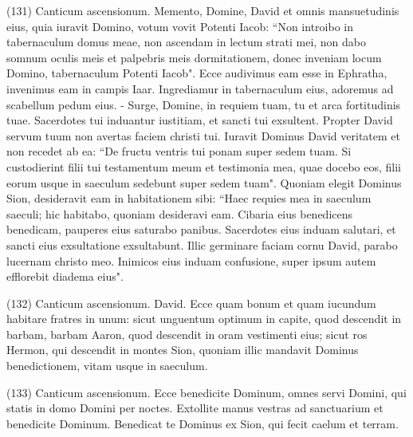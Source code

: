 \begin{biblechapter}  (131) 
\verse  Canticum ascensionum. Memento, Domine, David et omnis mansuetudinis eius, 
\verse quia iuravit Domino, votum vovit Potenti Iacob: 
\verse “Non introibo in tabernaculum domus meae, non ascendam in lectum strati mei, 
\verse non dabo somnum oculis meis et palpebris meis dormitationem, 
\verse donec inveniam locum Domino, tabernaculum Potenti Iacob". 
\verse Ecce audivimus eam esse in Ephratha, invenimus eam in campis Iaar. 
\verse Ingrediamur in tabernaculum eius, adoremus ad scabellum pedum eius. - 
\verse Surge, Domine, in requiem tuam, tu et arca fortitudinis tuae. 
\verse Sacerdotes tui induantur iustitiam, et sancti tui exsultent. 
\verse Propter David servum tuum non avertas faciem christi tui. 
\verse Iuravit Dominus David veritatem et non recedet ab ea: “De fructu ventris tui ponam super sedem tuam. 
\verse Si custodierint filii tui testamentum meum et testimonia mea, quae docebo eos, filii eorum usque in saeculum sedebunt super sedem tuam". 
\verse Quoniam elegit Dominus Sion, desideravit eam in habitationem sibi: 
\verse “Haec requies mea in saeculum saeculi; hic habitabo, quoniam desideravi eam. 
\verse Cibaria eius benedicens benedicam, pauperes eius saturabo panibus. 
\verse Sacerdotes eius induam salutari, et sancti eius exsultatione exsultabunt. 
\verse Illic germinare faciam cornu David, parabo lucernam christo meo. 
\verse Inimicos eius induam confusione, super ipsum autem efflorebit diadema eius". 
\end{biblechapter}

\begin{biblechapter}  (132) 
\verse  Canticum ascensionum. David. Ecce quam bonum et quam iucundum habitare fratres in unum: 
\verse sicut unguentum optimum in capite, quod descendit in barbam, barbam Aaron, quod descendit in oram vestimenti eius; 
\verse sicut ros Hermon, qui descendit in montes Sion, quoniam illic mandavit Dominus benedictionem, vitam usque in saeculum. 
\end{biblechapter}

\begin{biblechapter}  (133) 
\verse  Canticum ascensionum. Ecce benedicite Dominum, omnes servi Domini, qui statis in domo Domini per noctes. 
\verse Extollite manus vestras ad sanctuarium et benedicite Dominum. 
\verse Benedicat te Dominus ex Sion, qui fecit caelum et terram. 
\end{biblechapter}

